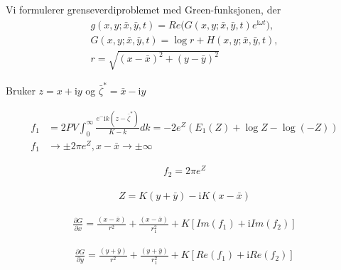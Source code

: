 Vi formulerer grenseverdiproblemet med Green-funksjonen, der
\begin{align}
	g(x,y; \bar{x}, \bar{y}, t) = Re\big( G(x,y; \bar{x}, \bar{y}, t) e^{\mathrm{i} \omega t} \big),\\
	G(x,y; \bar{x}, \bar{y}, t) =\log r + H(x,y; \bar{x}, \bar{y}, t), \\ 
	r = \sqrt{(x- \bar{x})^2 + (y- \bar{y})^2}
\end{align}



Bruker $z = x + \mathrm{i}  y$ og $\bar{\zeta }^* = \bar{x} -\mathrm{i}  y$
 
\begin{align}
f_1 &= 2PV \int_0^{\infty} \frac{e^-\mathrm{i} k(z-\bar{\zeta }^*) }{K-k} dk = -2e^Z(E_1(Z) + \log Z - \log(-Z)) \\
f_1 &\rightarrow \pm 2 \pi e^Z, x-\bar{x} \rightarrow\pm\infty
\end{align}
  
\begin{align}
f_2 = 2 \pi e^Z
\end{align}
 
\begin{align}
Z = K(y +\bar{y}) - \mathrm{i} K (x- \bar{x})
\end{align}
 
\begin{align}
\frac{\partial G}{\partial x} = \frac{(x -\bar{x})}{r^2} + \frac{  (x- \bar{x})}{r_1^2} + K[Im(f_1)+\mathrm{i} Im(f_2)]
\end{align}
  
\begin{align}
\frac{\partial G}{\partial y} = \frac{ (y +\bar{y}) }{r^2} + \frac{  (y + \bar{y}) }{r_1^2} + K[Re(f_1)+\mathrm{i} Re(f_2)]
\end{align}

